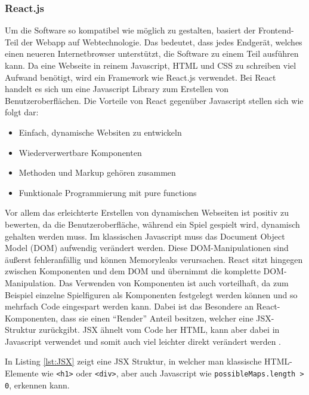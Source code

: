 \documentclass[12pt,a4paper,bibliography=totocnumbered,listof=totocnumbered]{article}
\begin{document}
\subsubsection{React.js}
Um die Software so kompatibel wie möglich zu gestalten, basiert der Frontend-Teil der Webapp auf Webtechnologie. Das bedeutet, dass jedes Endgerät, welches einen neueren 
Internetbrowser unterstützt, die Software zu einem Teil ausführen kann. Da eine Webseite in reinem Javascript, HTML und CSS zu schreiben viel Aufwand benötigt, 
wird ein Framework wie React.js verwendet. Bei React handelt es sich um eine Javascript Library zum Erstellen von Benutzeroberflächen.
Die Vorteile von React gegenüber Javascript stellen sich wie folgt dar:
\begin{itemize}
    \item Einfach, dynamische Websiten zu entwickeln
    \item Wiederverwertbare Komponenten
    \item Methoden und Markup gehören zusammen
    \item Funktionale Programmierung mit pure functions
\end{itemize}
Vor allem das erleichterte Erstellen von dynamischen Webseiten ist positiv zu bewerten, da die Benutzeroberfläche, während ein Spiel gespielt wird, dynamisch gehalten werden muss.
Im klassischen Javascript muss das Document Object Model (DOM) aufwendig verändert werden. Diese DOM-Manipulationen sind äußerst fehleranfällig und können Memoryleaks
verursachen. React sitzt hingegen zwischen Komponenten und dem DOM und übernimmt die komplette DOM-Manipulation.
Das Verwenden von Komponenten ist auch vorteilhaft, da zum Beispiel einzelne Spielfiguren als Komponenten festgelegt werden können 
und so mehrfach Code eingespart werden kann. 
Dabei ist das Besondere an React-Komponenten, dass sie einen ``Render'' Anteil besitzen, welcher eine JSX-Struktur zurückgibt. 
JSX ähnelt vom Code her HTML, kann aber dabei in Javascript verwendet und somit auch viel leichter direkt verändert werden \cite{React.js}.

\vspace{1em}
\begin{minipage}{\linewidth}

\end{minipage}

In Listing \ref{lst:JSX} zeigt eine JSX Struktur, in welcher man klassische HTML-Elemente wie \texttt{<h1>} oder \texttt{<div>}, aber auch Javascript wie 
\texttt{possibleMaps.length > 0}, erkennen kann.
\end{document}
